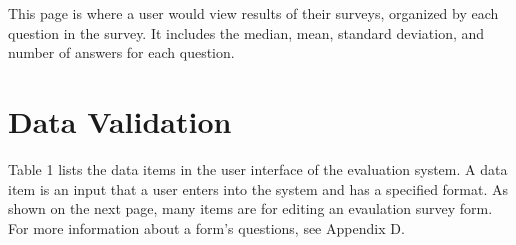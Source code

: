 \documentclass{article}
\begin{document}
This page is where a user would view results of their surveys, organized by each question in the survey. It includes the median, mean, standard deviation, and number of answers for each question.

\section{Data Validation}

Table 1 lists the data items in the user interface of the evaluation system. A data item is an input that a user enters into the system and has a specified format. As shown on the next page, many items are for editing an evaulation survey form. For more information about a form's questions, see Appendix D.

\vspace{2in}
\end{document}

